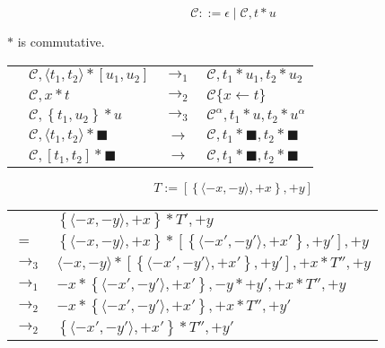\documentclass{article}
\newcommand{\ca}[2]{\langle #1, #2\rangle}
\newcommand{\cs}[2]{\left[#1, #2\right]}
\newcommand{\ee}[0]{\blacksquare}
\newcommand{\contr}[1]{\left\{#1\right\}}
\begin{document}
\newpage

\[ \mathcal{C} ::= \epsilon \mid \mathcal{C}, t * u \]

$*$ is commutative.

\vspace{1em}

\begin{tabular}{l l c l}
   & $\mathcal{C},\ca {t_1} {t_2} * \cs {u_1} {u_2}$ & $\to_1$ & $\mathcal{C}, t_1*u_1, t_2*u_2$ \\
   & $\mathcal{C}, x * t$ & $\to_2$ & $\mathcal{C}\{x \leftarrow t\}$ \\
   & $\mathcal{C},\contr{t_1, u_2} * u$ & $\to_3$ & $\mathcal{C}^\alpha, t_1*u, t_2*u^\alpha$ \\
   & $\mathcal{C},\ca {t_1} {t_2} * \ee$ & $\to$ & $\mathcal{C}, t_1*\ee, t_2*\ee$ \\
   & $\mathcal{C},\cs {t_1} {t_2} * \ee$ & $\to$ & $\mathcal{C}, t_1*\ee, t_2*\ee$ \\
\end{tabular}

\vspace{2em}

\[T := \cs{\contr{\ca{-x}{-y}, +x}}{+y}\]

\begin{tabular}{ll}
    & $\contr{\ca{-x}{-y}, +x} * T', +y$ \\
    $=$ & $\contr{\ca{-x}{-y}, +x} * \cs{\contr{\ca{-x'}{-y'}, +x'}}{+y'}, +y$ \\
    $\to_3$ & $\ca{-x}{-y} * \cs{\contr{\ca{-x'}{-y'}, +x'}}{+y'}, +x * T'', +y$ \\
    $\to_1$ & $-x * \contr{\ca{-x'}{-y'}, +x'}, {-y}*{+y'}, +x * T'', +y$ \\
    $\to_2$ & $-x * \contr{\ca{-x'}{-y'}, +x'}, +x * T'', +y'$ \\
    $\to_2$ & $\contr{\ca{-x'}{-y'}, +x'} * T'', +y'$ \\
\end{tabular}

\vspace{2em}

\end{document}
